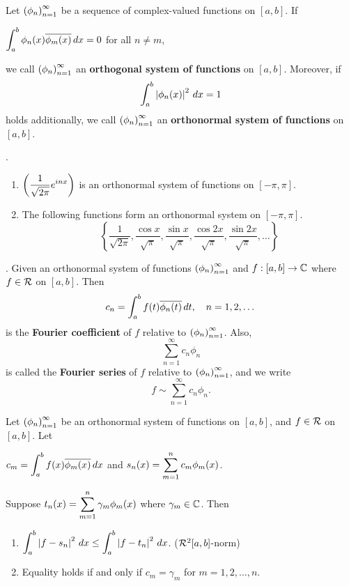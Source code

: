   Let \(\left( \phi_n \right)_{n=1}^\infty\) be a sequence of complex-valued functions on \([a, b]\). If
\begin{center}
    \(\displaystyle \int_a^b \phi_n(x) \overline{\phi_m(x)} \,d{x} = 0\) for all \(n \neq m\),
\end{center}
we call \(\left( \phi_n \right)_{n=1}^\infty\) an \textbf{orthogonal system of functions} on \([a, b]\). Moreover, if
\[
    \int_a^b \left| \phi_n(x) \right|^2 \,d{x} = 1
\]
holds additionally, we call \(\left( \phi_n \right)_{n=1}^\infty\) an \textbf{orthonormal system of functions} on \([a, b]\).

\ex.
\begin{enumerate}
    \item \(\left( \displaystyle \frac{1}{\sqrt{2\pi}} e^{inx} \right)\) is an orthonormal system of functions on \([-\pi, \pi]\).
    \item The following functions form an orthonormal system on \([-\pi, \pi]\).
    \[
        \left\{\frac{1}{\sqrt{2\pi}}, \frac{\cos x}{\sqrt{\pi}}, \frac{\sin x}{\sqrt{\pi}}, \frac{\cos 2x}{\sqrt{\pi}}, \frac{\sin 2x}{\sqrt{\pi}}, \dots\right\}
    \]
\end{enumerate}

\medskip

.  Given an orthonormal system of functions \(\left( \phi_n \right)_{n=1}^\infty\) and \(f: [a, b] \rightarrow \mathbb{C}\) where \(f \in \mathcal{R}\) on \([a, b]\). Then
\[
    c_n = \int_a^b f(t) \overline{\phi_n(t)} \,d{t}, \quad n = 1, 2, \dots
\]
is the \textbf{Fourier coefficient} of \(f\) relative to \(\left( \phi_n \right)_{n=1}^\infty\). Also,
\[
    \sum_{n=1}^\infty c_n \phi_n
\]
is called the \textbf{Fourier series} of \(f\) relative to \(\left( \phi_n \right)_{n=1}^\infty\), and we write
\[
    f \sim \sum_{n=1}^\infty c_n \phi_n.
\]

 Let \(\left( \phi_n \right)_{n=1}^\infty\) be an orthonormal system of functions on \([a, b]\), and \(f \in \mathcal{R}\) on \([a, b]\). Let
\begin{center}
    \(c_m = \displaystyle \int_a^b f(x)\overline{\phi_m(x)} \,d{x}\) \quad and \quad \(s_n(x) = \displaystyle\sum_{m=1}^n c_m \phi_m(x)\).
\end{center}
Suppose \(t_n(x) = \displaystyle\sum_{m=1}^n \gamma_m \phi_m(x)\) where \(\gamma_m \in \mathbb{C}\). Then
\begin{enumerate}
    \item \(\displaystyle \int_a^b \left| f - s_n \right|^2 \,d{x} \leq \int_a^b \left| f-t_n \right|^2 \,d{x}\). (\(\mathcal{R}^2[a, b]\)-norm)
    \item Equality holds if and only if \(c_m = \gamma_m\) for \(m = 1, 2, \dots, n\).
\end{enumerate}

